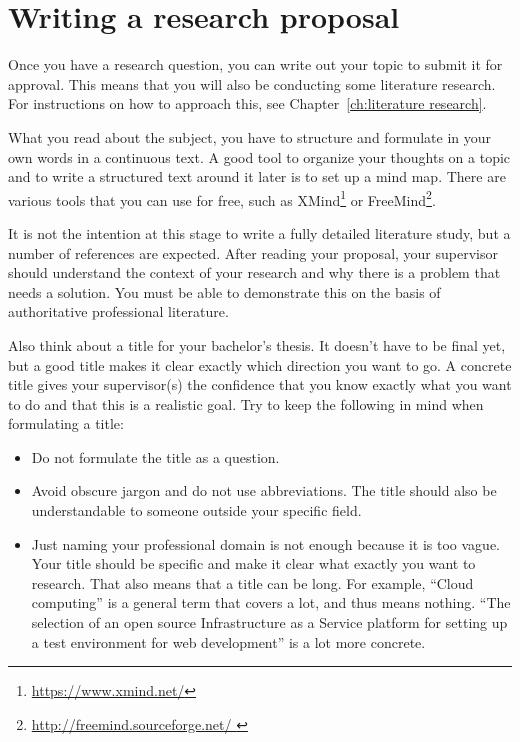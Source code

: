 \section{Writing a research proposal}
\label{sec:researchproposal}

Once you have a research question, you can write out your topic to submit it for approval. This means that you will also be conducting some literature research. For instructions on how to approach this, see Chapter~\ref{ch:literature research}.

What you read about the subject, you have to structure and formulate in your own words in a continuous text. A good tool to organize your thoughts on a topic and to write a structured text around it later is to set up a mind map. There are various tools that you can use for free, such as XMind\footnote{\url{https://www.xmind.net/}} or FreeMind\footnote{\url{http://freemind.sourceforge.net/ }}.


It is not the intention at this stage to write a fully detailed literature study, but a number of references are expected. After reading your proposal, your supervisor should understand the context of your research and why there is a problem that needs a solution. You must be able to demonstrate this on the basis of authoritative professional literature.

Also think about a title for your bachelor's thesis. It doesn't have to be final yet, but a good title makes it clear exactly which direction you want to go. A concrete title gives your supervisor(s) the confidence that you know exactly what you want to do and that this is a realistic goal. Try to keep the following in mind when formulating a title:

\begin{itemize}
    \item Do not formulate the title as a question.
    \item Avoid obscure jargon and do not use abbreviations. The title should also be understandable to someone outside your specific field.
    \item Just naming your professional domain is not enough because it is too vague. Your title should be specific and make it clear what exactly you want to research. That also means that a title can be long. For example, ``Cloud computing'' is a general term that covers a lot, and thus means nothing. ``The selection of an open source Infrastructure as a Service platform for setting up a test environment for web development'' is a lot more concrete.  
\end{itemize}

